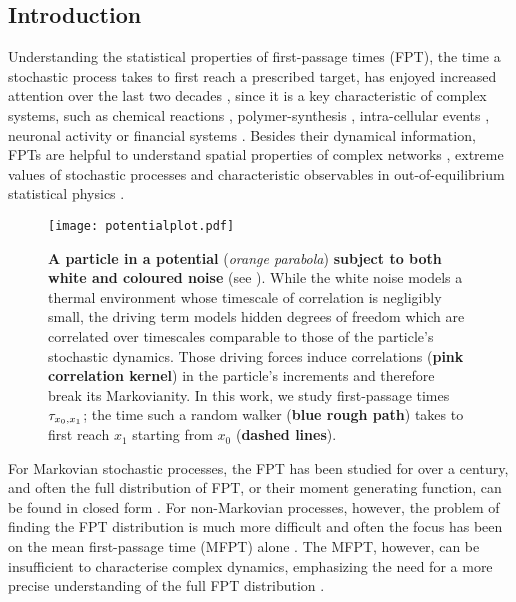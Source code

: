 \documentclass[%
 reprint,
superscriptaddress,
nofootinbib,
 amsmath,amssymb,
 aps,
prx,
]{revtex4-2}
\begin{document}
\subsection{Introduction}
Understanding the statistical properties of first-passage times (FPT), the time a stochastic process takes to first reach a prescribed target, has enjoyed increased attention over the last two decades \cite{kampen_stochastic_2007, redner_guide_2001,metzler_first-passage_2014}, since it is a key characteristic of complex systems, such as chemical reactions \cite{szabo_first_1980}, polymer-synthesis \cite{sokolov_cyclization_2003}, intra-cellular events \cite{ghusinga_first-passage_2017}, neuronal activity \cite{taillefumier_phase_2013} or financial systems \cite{metzler_applications_2014}. Besides their dynamical information, FPTs are helpful to understand spatial properties of complex networks \cite{tejedor_global_2009}, extreme values of stochastic processes \cite{hartich_extreme_2019} and characteristic observables in out-of-equilibrium statistical physics \cite{bray_persistence_2013}.

\begin{figure}
    \centering
    \texttt{[image: potentialplot.pdf]}
    \caption{\textbf{A particle in a potential} (\textit{orange parabola}) \textbf{subject to both white and coloured noise} (see ). While the white noise models a thermal environment whose timescale of correlation is negligibly small, the driving term models hidden degrees of freedom which are correlated over timescales comparable to those of the particle's stochastic dynamics. Those driving forces induce correlations (\textbf{pink correlation kernel}) in the particle's increments and therefore break its Markovianity. In this work, we study first-passage times $\tau_{x_0,x_1}$; the time such a random walker (\textbf{blue rough path}) takes to first reach $x_1$ starting from $x_0$ (\textbf{dashed lines}). }
    \label{fig:sketch_potential}
\end{figure}

For Markovian stochastic processes, the FPT has been studied for over a century, and often the full distribution of FPT, or their moment generating function, can be found in closed form \cite{erwin_schrodinger_zur_1915,pontryagin_appendix_1989,siegert_first_1951,darling_first_1953}. For non-Markovian processes, however, the problem of finding the FPT distribution is  much more difficult and often the focus has been on the mean first-passage time (MFPT) alone \cite{masoliver_first-passage_1986,kus_mean_1990,kus_mean_1991,ramrez-piscina_first-passage_1991,dykman_probability_1993,schimansky-geier_colored_1997,fox_mean_1988,hanggi_colored_1995,guerin_mean_2016}. The MFPT, however, can be insufficient to characterise complex dynamics, emphasizing the need for a more precise understanding of the full FPT distribution \cite{godec_first_2016,godec_universal_2016}. 
\end{document}
